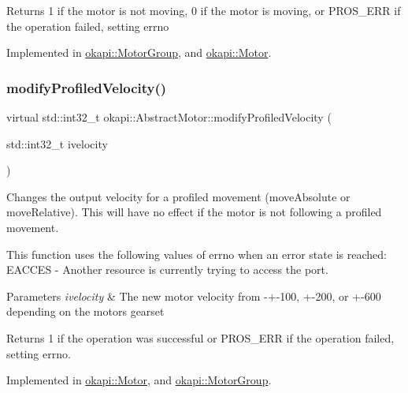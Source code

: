 \begin{DoxyReturn}{Returns}
1 if the motor is not moving, 0 if the motor is moving, or P\+R\+O\+S\+\_\+\+E\+RR if the operation failed, setting errno 
\end{DoxyReturn}


Implemented in \mbox{\hyperlink{classokapi_1_1MotorGroup_a50dfcb9272ad53aa231119a523ad2f2e}{okapi\+::\+Motor\+Group}}, and \mbox{\hyperlink{classokapi_1_1Motor_ab4edaf8e4ed576fa2003d4cc8e02c364}{okapi\+::\+Motor}}.

\mbox{\label{classokapi_1_1AbstractMotor_a1d131cbf0b8a325a54034e540c3be6d2}} 
\subsubsection{\texorpdfstring{modifyProfiledVelocity()}{modifyProfiledVelocity()}}
{\footnotesize\ttfamily virtual std\+::int32\+\_\+t okapi\+::\+Abstract\+Motor\+::modify\+Profiled\+Velocity (\begin{DoxyParamCaption}\item[{std\+::int32\+\_\+t}]{ivelocity }\end{DoxyParamCaption})\hspace{0.3cm}{\ttfamily [pure virtual]}}

Changes the output velocity for a profiled movement (move\+Absolute or move\+Relative). This will have no effect if the motor is not following a profiled movement.

This function uses the following values of errno when an error state is reached\+: E\+A\+C\+C\+ES -\/ Another resource is currently trying to access the port.


\begin{DoxyParams}{Parameters}
{\em ivelocity} & The new motor velocity from -\/+-\/100, +-\/200, or +-\/600 depending on the motor\textquotesingle{}s gearset \\
\hline
\end{DoxyParams}
\begin{DoxyReturn}{Returns}
1 if the operation was successful or P\+R\+O\+S\+\_\+\+E\+RR if the operation failed, setting errno. 
\end{DoxyReturn}


Implemented in \mbox{\hyperlink{classokapi_1_1Motor_a8778f90005a3add64d0dfd7574fb8289}{okapi\+::\+Motor}}, and \mbox{\hyperlink{classokapi_1_1MotorGroup_a616f20db24f1eff4d3641b86faef4fbd}{okapi\+::\+Motor\+Group}}.

